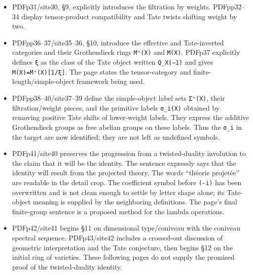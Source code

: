 \documentclass[
  10pt,
]{article}
\providecommand{\tightlist}{%
  \setlength{\itemsep}{0pt}\setlength{\parskip}{0pt}}
\providecommand{\tightlist}{\setlength{\itemsep}{0pt}\setlength{\parskip}{0pt}}
\begin{document}
\begin{itemize}
\tightlist
\item
  PDFp31/site30, §9, explicitly introduces the filtration by weights.
  PDFpp32--34 display tensor-product compatibility and Tate twists
  shifting weight by two.
\item
  PDFpp36--37/site35--36, §10, introduce the effective and Tate-inverted
  categories and their Grothendieck rings
  \texttt{\small M⁺(\allowbreak{}X)\allowbreak{}} and
  \texttt{\small M(\allowbreak{}X)\allowbreak{}}. PDFp37 explicitly
  defines \texttt{\small ξ} as the class of the Tate object written
  \texttt{\small Q\_\allowbreak{}X(\allowbreak{}−1)\allowbreak{}} and
  gives
  \texttt{\small M(\allowbreak{}X)\allowbreak{}=\allowbreak{}M⁺(\allowbreak{}X)\allowbreak{}[\allowbreak{}1/\allowbreak{}ξ]\allowbreak{}}.
  The page states the tensor-category and finite-length/simple-object
  framework being used.
\item
  PDFpp38--40/site37--39 define the simple-object label sets
  \texttt{\small Σ⁺(\allowbreak{}X)\allowbreak{}}, their
  filtration/weight pieces, and the primitive labels
  \texttt{\small σ\_\allowbreak{}i(\allowbreak{}X)\allowbreak{}}
  obtained by removing positive Tate shifts of lower-weight labels. They
  express the additive Grothendieck groups as free abelian groups on
  these labels. Thus the \texttt{\small σ\_\allowbreak{}i} in the target
  are now identified; they are not left as undefined symbols.
\item
  PDFp41/site40 preserves the progression from a twisted-duality
  involution to the claim that it will be the identity. The sentence
  expressly says that the identity will result from the projected
  theory. The words ``théorie projetée'' are readable in the detail
  crop. The coefficient symbol before
  \texttt{\small (\allowbreak{}-\allowbreak{}i)\allowbreak{}} has been
  overwritten and is not clean enough to settle by letter shape alone;
  its Tate-object meaning is supplied by the neighboring definitions.
  The page's final finite-group sentence is a proposed method for the
  lambda operations.
\item
  PDFp42/site41 begins §11 on dimensional type/coniveau with the
  coniveau spectral sequence. PDFp43/site42 includes a crossed-out
  discussion of geometric interpretation and the Tate conjecture, then
  begins §12 on the initial ring of varieties. These following pages do
  not supply the promised proof of the twisted-duality identity.
\end{itemize}
\end{document}
